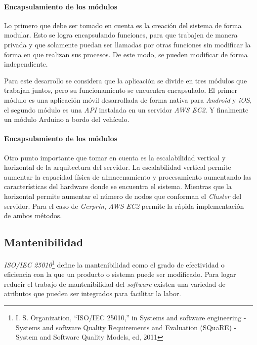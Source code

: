 \paragraph{Encapsulamiento de los módulos\\}

Lo primero que debe ser tomado en cuenta es la creación del sistema de forma modular. Esto se logra encapsulando funciones, para que trabajen de manera privada y que solamente puedan ser llamadas por otras funciones sin modificar la forma en que realizan sus procesos. De este modo, se pueden modificar de forma independiente. 

Para este desarrollo se considera que la aplicación se divide en tres módulos que trabajan juntos, pero su funcionamiento se encuentra encapsulado. El primer módulo es una aplicación móvil desarrollada de forma nativa para \emph{Android} y \emph{iOS}, el segundo módulo es una \emph{API} instalada en un servidor \emph{AWS EC2}. Y finalmente un módulo Arduino a bordo del vehículo. 

\paragraph{Encapsulamiento de los módulos\\}

Otro punto importante que tomar en cuenta es la escalabilidad vertical y horizontal de la arquitectura del servidor. La escalabilidad vertical permite aumentar la capacidad física de almacenamiento y procesamiento aumentando las características del hardware donde se encuentra el sistema. Mientras que la horizontal permite aumentar el número de nodos que conforman el \emph{Cluster} del servidor. Para el caso de \emph{Gerprin}, \emph{AWS EC2} permite la rápida implementación de ambos métodos.

\subsection{Mantenibilidad}

\emph{ISO/IEC 25010}\footnote{I. S. Organization, “ISO/IEC 25010,” in Systems and software engineering - Systems and software Quality Requirements and Evaluation (SQuaRE) - System and Software Quality Models, ed, 2011} define la mantenibilidad como el grado de efectividad o eficiencia con la que un producto o sistema puede ser modificado. Para logar reducir el trabajo de mantenibilidad del \emph{software} existen una variedad de atributos que pueden ser integrados para facilitar la labor. 

